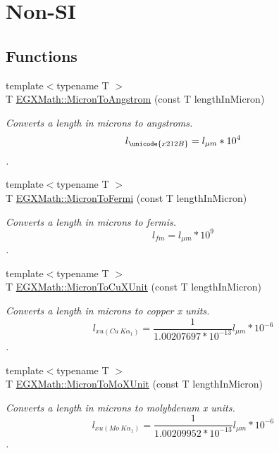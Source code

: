 \hypertarget{group___e_g_x_math-_conversions-_length_conversions-_non-_s_i-_micron-_non-_s_i}{}\section{Non-\/\+SI}
\label{group___e_g_x_math-_conversions-_length_conversions-_non-_s_i-_micron-_non-_s_i}
\subsection*{Functions}
\begin{DoxyCompactItemize}
\item 
{\footnotesize template$<$typename T $>$ }\\T \mbox{\hyperlink{group___e_g_x_math-_conversions-_length_conversions-_non-_s_i-_micron-_non-_s_i_ga34f8c07bfb65b584298dd7be114b85ad}{E\+G\+X\+Math\+::\+Micron\+To\+Angstrom}} (const T length\+In\+Micron)
\begin{DoxyCompactList}\small\item\em Converts a length in microns to angstroms. \[ l_{\unicode{x212B}}=l_{\mu m} * 10^{4} \]. \end{DoxyCompactList}\item 
{\footnotesize template$<$typename T $>$ }\\T \mbox{\hyperlink{group___e_g_x_math-_conversions-_length_conversions-_non-_s_i-_micron-_non-_s_i_ga15284641d32129d8a82d4e50eaea346d}{E\+G\+X\+Math\+::\+Micron\+To\+Fermi}} (const T length\+In\+Micron)
\begin{DoxyCompactList}\small\item\em Converts a length in microns to fermis. \[ l_{fm}=l_{\mu m} * 10^{9} \]. \end{DoxyCompactList}\item 
{\footnotesize template$<$typename T $>$ }\\T \mbox{\hyperlink{group___e_g_x_math-_conversions-_length_conversions-_non-_s_i-_micron-_non-_s_i_gaa582745d86b8b016faa9ad442b18ce8f}{E\+G\+X\+Math\+::\+Micron\+To\+Cu\+X\+Unit}} (const T length\+In\+Micron)
\begin{DoxyCompactList}\small\item\em Converts a length in microns to copper x units. \[ l_{xu(Cu\ K\alpha_1)}= \frac{1}{1.00207697*10^{-13}} l_{\mu m} * 10^{-6}\]. \end{DoxyCompactList}\item 
{\footnotesize template$<$typename T $>$ }\\T \mbox{\hyperlink{group___e_g_x_math-_conversions-_length_conversions-_non-_s_i-_micron-_non-_s_i_ga4bdfec28657cb037fc0830a95ceb79ca}{E\+G\+X\+Math\+::\+Micron\+To\+Mo\+X\+Unit}} (const T length\+In\+Micron)
\begin{DoxyCompactList}\small\item\em Converts a length in microns to molybdenum x units. \[ l_{xu(Mo\ K\alpha_1)}=\frac{1}{1.00209952*10^{-13}} l_{\mu m} * 10^{-6}\]. \end{DoxyCompactList}\end{DoxyCompactItemize}


